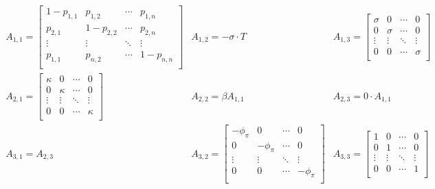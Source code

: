 \documentclass[11pt]{article}
\begin{document}
\begin{singlespace}
		\begin{align*}
		\begin{array}{lll}
			A_{1,1} = 
			\begin{bmatrix}
				1-p_{1,1} & p_{1,2} & \cdots & p_{1,n} \\
				p_{2,1} & 1-p_{2,2} & \cdots & p_{2,n} \\
				\vdots & \vdots & \ddots & \vdots \\
				p_{1,1} & p_{n,2} & \cdots & 1-p_{n,n} \\
			\end{bmatrix} & 
			A_{1,2} = -\sigma\cdot T& 
			A_{1,3} = 
			\begin{bmatrix}
				\sigma & 0 & \cdots & 0 \\
				0 & \sigma & \cdots & 0 \\
				\vdots & \vdots & \ddots & \vdots \\
				0 & 0 & \cdots & \sigma \\
			\end{bmatrix}\\
			A_{2,1} = 
			\begin{bmatrix}
				\kappa & 0 & \cdots & 0 \\
				0 & \kappa & \cdots & 0 \\
				\vdots & \vdots & \ddots & \vdots \\
				0 & 0 & \cdots & \kappa \\
			\end{bmatrix}& 
			A_{2,2} = \beta A_{1,1}& 
			A_{2,3} = 0\cdot A_{1,1}\\
			A_{3,1} = A_{2,3}& 
			A_{3,2} = 
			\begin{bmatrix}
				-\phi_{\pi} & 0 & \cdots & 0 \\
				0 & -\phi_{\pi} & \cdots & 0 \\
				\vdots & \vdots & \ddots & \vdots \\
				0 & 0 & \cdots & -\phi_{\pi} \\
			\end{bmatrix}& 
			A_{3,3} = 
			\begin{bmatrix}
				1 & 0 & \cdots & 0 \\
				0 & 1 & \cdots & 0 \\
				\vdots & \vdots & \ddots & \vdots \\
				0 & 0 & \cdots & 1 \\
			\end{bmatrix}
		\end{array}
		\end{align*}
		

\end{singlespace}
\end{document}
